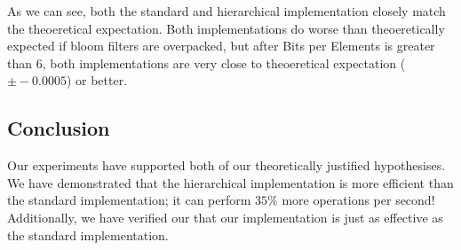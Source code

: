 As we can see, both the standard and hierarchical implementation closely match the theoeretical expectation. 
Both implementations do worse than theoeretically expected if bloom filters are overpacked, but after Bits per Elements is greater than 6, both implementations are very close to theoeretical expectation ($\pm -0.0005$) or better.

\subsection{Conclusion}
Our experiments have supported both of our theoretically justified hypothesises.
We have demonstrated that the hierarchical implementation is more efficient than the standard implementation; it can perform $35\%$ more operations per second!
Additionally, we have verified our that our implementation is just as effective as the standard implementation. 
